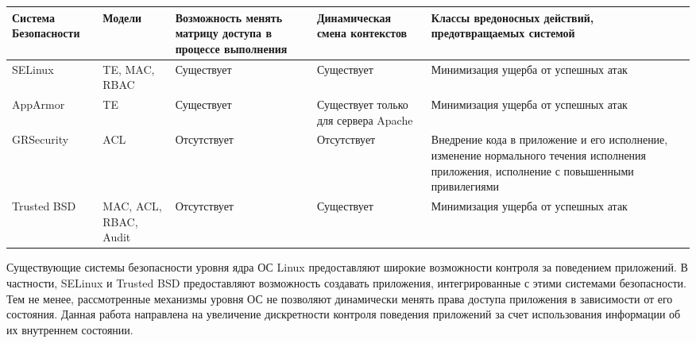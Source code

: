 \begin{scriptsize}
\bigskip
\begin{center}
\begin{tabular}{|p{2cm}|p{2.5cm}|p{3cm}|p{3cm}|p{3cm}|} 
\hline
Система Безопасности & Модели & Возможность менять матрицу 
доступа в процессе выполнения & 
Динамическая смена контекстов & Классы вредоносных действий,
предотвращаемых системой \\
\hline 
SELinux & TE, MAC, RBAC & Существует & Существует & 
Минимизация ущерба от успешных атак \\
\hline
AppArmor & TE & Существует & Существует только для сервера Apache & 
Минимизация ущерба от успешных атак \\ 
\hline 
GRSecurity & ACL & Отсутствует & Отсутствует & Внедрение кода в приложение 
и его исполнение, изменение нормального течения исполнения приложения, 
исполнение с повышенными привилегиями \\ 
\hline 
Trusted BSD & MAC, ACL, RBAC, Audit & Отсутствует & Существует & 
Минимизация ущерба от успешных атак \\ 
\hline
\end{tabular} 
\end{center} 
\end{scriptsize} 


\bigskip
Существующие системы безопасности уровня ядра ОС Linux 
предоставляют широкие возможности контроля за поведением 
приложений. В частности, SELinux и Trusted BSD 
 предоставляют возможность 
создавать приложения, интегрированные с этими системами 
безопасности. Тем не менее, рассмотренные механизмы уровня 
ОС не позволяют динамически менять права доступа приложения 
в зависимости от его состояния. Данная работа направлена на 
увеличение дискретности контроля поведения приложений за счет 
использования информации об их внутреннем состоянии. 
\bigskip
